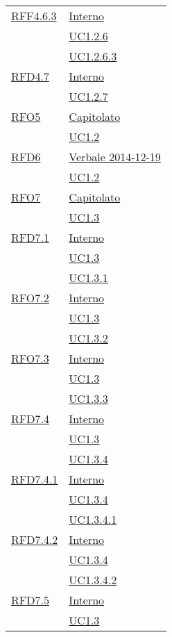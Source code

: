 \begin{longtable}{|>{\centering}m{5cm}|m{5cm}<{\centering}|}
\hyperlink{RFF4.6.3}{RFF4.6.3} & \hyperlink{Interno}{Interno}\\
& \hyperref[UC1.2.6]{UC1.2.6}\\
& \hyperref[UC1.2.6.3]{UC1.2.6.3}\\ \hline
\hyperlink{RFD4.7}{RFD4.7} & \hyperlink{Interno}{Interno}\\
& \hyperref[UC1.2.7]{UC1.2.7}\\ \hline
\hyperlink{RFO5}{RFO5} & \hyperlink{Capitolato}{Capitolato}\\
& \hyperref[UC1.2]{UC1.2}\\ \hline
\hyperlink{RFD6}{RFD6} & \hyperlink{Verbale 2014-12-19}{Verbale 2014-12-19}\\
& \hyperref[UC1.2]{UC1.2}\\ \hline
\hyperlink{RFO7}{RFO7} & \hyperlink{Capitolato}{Capitolato}\\
& \hyperref[UC1.3]{UC1.3}\\ \hline
\hyperlink{RFD7.1}{RFD7.1} & \hyperlink{Interno}{Interno}\\
& \hyperref[UC1.3]{UC1.3}\\
& \hyperref[UC1.3.1]{UC1.3.1}\\ \hline
\hyperlink{RFO7.2}{RFO7.2} & \hyperlink{Interno}{Interno}\\
& \hyperref[UC1.3]{UC1.3}\\
& \hyperref[UC1.3.2]{UC1.3.2}\\ \hline
\hyperlink{RFO7.3}{RFO7.3} & \hyperlink{Interno}{Interno}\\
& \hyperref[UC1.3]{UC1.3}\\
& \hyperref[UC1.3.3]{UC1.3.3}\\ \hline
\hyperlink{RFD7.4}{RFD7.4} & \hyperlink{Interno}{Interno}\\
& \hyperref[UC1.3]{UC1.3}\\
& \hyperref[UC1.3.4]{UC1.3.4}\\ \hline
\hyperlink{RFD7.4.1}{RFD7.4.1} & \hyperlink{Interno}{Interno}\\
& \hyperref[UC1.3.4]{UC1.3.4}\\
& \hyperref[UC1.3.4.1]{UC1.3.4.1}\\ \hline
\hyperlink{RFD7.4.2}{RFD7.4.2} & \hyperlink{Interno}{Interno}\\
& \hyperref[UC1.3.4]{UC1.3.4}\\
& \hyperref[UC1.3.4.2]{UC1.3.4.2}\\ \hline
\hyperlink{RFD7.5}{RFD7.5} & \hyperlink{Interno}{Interno}\\
& \hyperref[UC1.3]{UC1.3}\\

\end{longtable}
